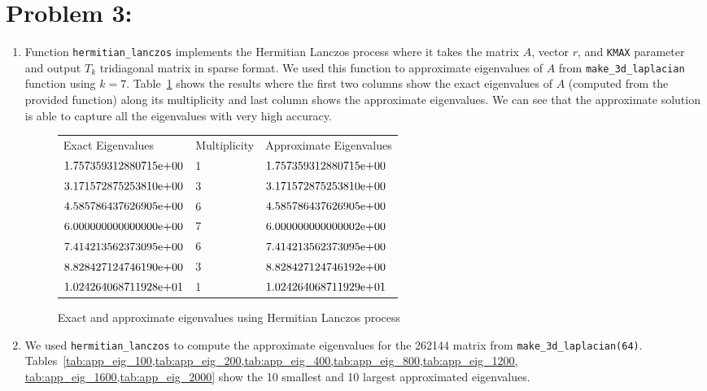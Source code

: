 \newpage
\section*{Problem 3:}
\begin{enumerate}
\item Function \texttt{hermitian\_lanczos} implements the Hermitian Lanczos process where it takes the matrix $A$, vector $r$, and \texttt{KMAX} parameter and output $T_{k}$ tridiagonal matrix in sparse format. We used this function to approximate eigenvalues of $A$ from \texttt{make\_3d\_laplacian} function using $k=7$. Table~\ref{tab:app_eig_7} shows the results where the first two columns show the exact eigenvalues of $A$ (computed from the provided function) along its multiplicity and last column shows the approximate eigenvalues. We can see that the approximate solution is able to capture all the eigenvalues with very high accuracy.

\begin{figure}[tbh]
 \centering    
\begin{tabular}{ |p{5cm}| p{2cm}|| p{5cm}|}
\hline
 Exact Eigenvalues  & Multiplicity & Approximate Eigenvalues \\ \hhline{|=|=|=|}   
${1.757359312880715}\mathrm{e}{+00}$ & 1& ${1.757359312880715}\mathrm{e}{+00}$ \\
${3.171572875253810}\mathrm{e}{+00}$ &3 & ${3.171572875253810}\mathrm{e}{+00}$ \\
${4.585786437626905}\mathrm{e}{+00}$ &6 & ${4.585786437626905}\mathrm{e}{+00}$ \\
${6.000000000000000}\mathrm{e}{+00}$ & 7& ${6.000000000000002}\mathrm{e}{+00}$ \\
${7.414213562373095}\mathrm{e}{+00}$&6 & ${7.414213562373095}\mathrm{e}{+00}$ \\
${8.828427124746190}\mathrm{e}{+00}$ &3 & ${8.828427124746192}\mathrm{e}{+00}$ \\
${1.024264068711928}\mathrm{e}{+01}$ &1 & ${1.024264068711929}\mathrm{e}{+01}$ \\
\hline
\end{tabular} 
\caption{Exact and approximate eigenvalues using Hermitian Lanczos process}
   \label{tab:app_eig_7}
\end{figure}

\item We used \texttt{hermitian\_lanczos} to compute the approximate eigenvalues for the 262144  matrix from \texttt{make\_3d\_laplacian(64)}. Tables~\ref{tab:app_eig_100,tab:app_eig_200,tab:app_eig_400,tab:app_eig_800,tab:app_eig_1200, tab:app_eig_1600,tab:app_eig_2000} show the 10 smallest and 10 largest approximated eigenvalues. 


\end{enumerate}
